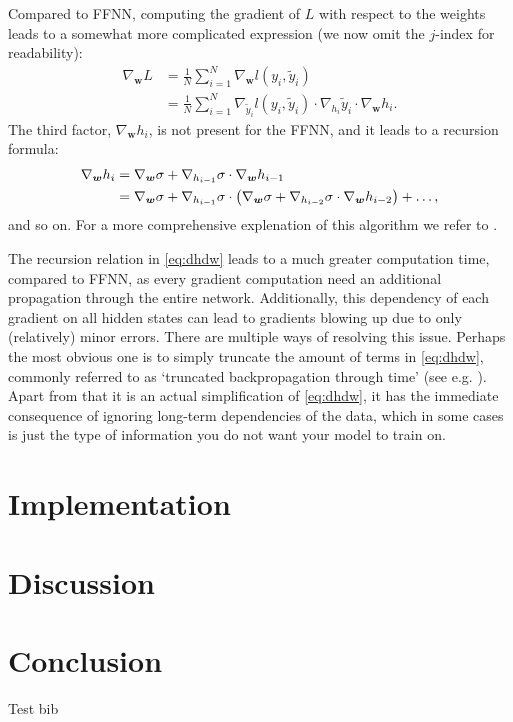 \documentclass[%
reprint,
amsmath,amssymb,
aps,
]{revtex4-2}
\begin{document}
Compared to FFNN, computing the gradient of \(L\) with respect to the weights leads to a somewhat more complicated expression (we now omit the \(j\)-index for readability):
\begin{align}
	\nabla_{\boldsymbol{w}} L &= \frac{1}{N}\sum\limits_{i=1}^{N} \nabla_{\boldsymbol{w}} l(y_{i}, \tilde{y}_i) \\
	&= \frac{1}{N}\sum\limits_{i=1}^{N} \nabla_{\tilde{y}_i} l(y_i, \tilde{y}_i) \cdot \nabla_{h_i} \tilde{y}_i \cdot \nabla_{\boldsymbol{w}} h_i.
\end{align}
The third factor, \( \nabla_{\boldsymbol{w}} h_i \), is not present for the FFNN, and it leads to a recursion formula:
\begin{align}	\label{eq:dhdw}
	\nabla_{\boldsymbol{w}} h_i &= \nabla_{\boldsymbol{w}} \sigma + \nabla_{h_{i-1}} \sigma \cdot \nabla_{\boldsymbol{w}} h_{i-1} \notag\\ 
	&= \nabla_{\boldsymbol{w}} \sigma + \nabla_{h_{i-1}} \sigma \cdot \left( \nabla_{\boldsymbol{w}} \sigma + \nabla_{h_{i-2}} \sigma \cdot \nabla_{\boldsymbol{w}} h_{i-2} \right) + \dots,
\end{align}
and so on. For a more comprehensive explenation of this algorithm we refer to \cite{jaeger2002tutorial}. 

The recursion relation in \eqref{eq:dhdw} leads to a much greater computation time, compared to FFNN, as every gradient computation need an additional propagation through the entire network. Additionally, this dependency of each gradient on all hidden states can lead to gradients blowing up due to only (relatively) minor errors. There are multiple ways of resolving this issue. Perhaps the most obvious one is to simply truncate the amount of terms in \eqref{eq:dhdw}, commonly referred to as `truncated backpropagation through time' (see e.g. \cite{tallec2017unbiasingtruncatedbackpropagationtime}). Apart from that it is an actual simplification of \eqref{eq:dhdw}, it has the immediate consequence of ignoring long-term dependencies of the data, which in some cases is just the type of information you do not want your model to train on. 



\section{Implementation}

\section{Discussion}

\section{Conclusion}
Test bib \cite{Planck:2018vyg}



	
\end{document}

